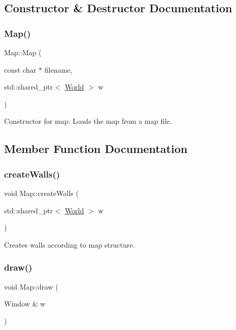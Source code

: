 \subsection{Constructor \& Destructor Documentation}
\hypertarget{classMap_a067a9c057cdf715cbe1484efad9bff27}{}\label{classMap_a067a9c057cdf715cbe1484efad9bff27} 
\subsubsection{\texorpdfstring{Map()}{Map()}}
{\footnotesize\ttfamily Map\+::\+Map (\begin{DoxyParamCaption}\item[{const char $\ast$}]{filename,  }\item[{std\+::shared\+\_\+ptr$<$ \hyperlink{classWorld}{World} $>$}]{w }\end{DoxyParamCaption})}

Constructor for map. Loads the map from a map file. 

\subsection{Member Function Documentation}
\hypertarget{classMap_a122f46ddff5b5d0b8377425a9a176502}{}\label{classMap_a122f46ddff5b5d0b8377425a9a176502} 
\subsubsection{\texorpdfstring{create\+Walls()}{createWalls()}}
{\footnotesize\ttfamily void Map\+::create\+Walls (\begin{DoxyParamCaption}\item[{std\+::shared\+\_\+ptr$<$ \hyperlink{classWorld}{World} $>$}]{w }\end{DoxyParamCaption})}

Creates walls according to map structure. \hypertarget{classMap_aa1621a8865fc469ae9c05c08967e4f2c}{}\label{classMap_aa1621a8865fc469ae9c05c08967e4f2c} 
\subsubsection{\texorpdfstring{draw()}{draw()}}
{\footnotesize\ttfamily void Map\+::draw (\begin{DoxyParamCaption}\item[{Window \&}]{w }\end{DoxyParamCaption})}


